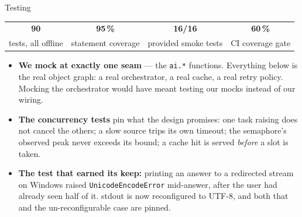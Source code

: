 \documentclass[aspectratio=169,11pt]{beamer}
\begin{document}
\begin{frame}{Testing}
  \begin{center}\small
  \begin{tabular}{cccc}
    \toprule
    \textbf{90} & \textbf{95\,\%} & \textbf{16/16} & \textbf{60\,\%} \\
    tests, all offline & statement coverage & provided smoke tests & CI coverage gate \\
    \bottomrule
  \end{tabular}
  \end{center}

  \vspace{0.4em}
  \begin{itemize}\setlength\itemsep{4pt}
    \item \textbf{We mock at exactly one seam} --- the \texttt{ai.*} functions. Everything below is
    the real object graph: a real orchestrator, a real cache, a real retry policy. Mocking the
    orchestrator would have meant testing our mocks instead of our wiring.
    \item \textbf{The concurrency tests} pin what the design promises: one task raising does not
    cancel the others; a slow source trips its own timeout; the semaphore's observed peak never
    exceeds its bound; a cache hit is served \emph{before} a slot is taken.
    \item \textbf{The test that earned its keep:} printing an answer to a redirected stream on
    Windows raised \texttt{UnicodeEncodeError} mid-answer, after the user had already seen half of
    it. stdout is now reconfigured to UTF-8, and both that and the un-reconfigurable case are pinned.
  \end{itemize}
\end{frame}
\end{document}
